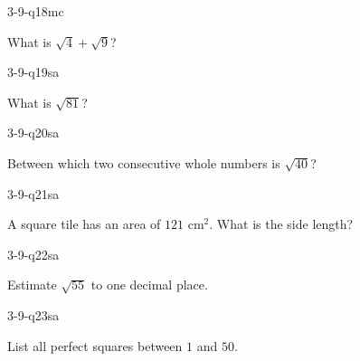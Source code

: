 \begin{practiceQuestion}{3-9-q18}{mc}
\begin{questionText}
What is $\sqrt{4} + \sqrt{9}$?
\end{questionText}
\end{practiceQuestion}


\begin{practiceQuestion}{3-9-q19}{sa}
\begin{questionText}
What is $\sqrt{81}$?
\end{questionText}
\end{practiceQuestion}

\begin{practiceQuestion}{3-9-q20}{sa}
\begin{questionText}
Between which two consecutive whole numbers is $\sqrt{40}$?
\end{questionText}
\end{practiceQuestion}

\begin{practiceQuestion}{3-9-q21}{sa}
\begin{questionText}
A square tile has an area of $121$ cm$^2$. What is the side length?
\end{questionText}
\end{practiceQuestion}

\begin{practiceQuestion}{3-9-q22}{sa}
\begin{questionText}
Estimate $\sqrt{55}$ to one decimal place.
\end{questionText}
\end{practiceQuestion}

\begin{practiceQuestion}{3-9-q23}{sa}
\begin{questionText}
List all perfect squares between $1$ and $50$.
\end{questionText}
\end{practiceQuestion}

